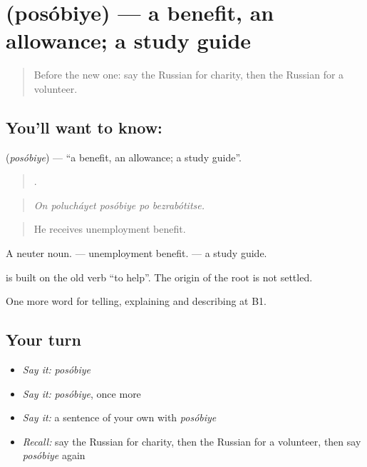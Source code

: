 \section[\texorpdfstring{\ru{пособие} (posóbiye)}{пособие (posóbiye)}]{ (posóbiye) — a benefit, an allowance; a study guide}

\label{lesson:RU-C368-posobie}



\begin{quote}
Before the new one: say the Russian for charity, then the Russian for a volunteer.
\end{quote}

\subsection*{You'll want to know: }
\textbf{} (\emph{posóbiye}) — \textquotedblleft{}a benefit, an allowance; a study guide\textquotedblright{}.

\begin{quote}
    .
\end{quote}

\begin{quote}
\emph{On polucháyet posóbiye po bezrabótitse.}
\end{quote}

\begin{quote}
He receives unemployment benefit.
\end{quote}

A neuter noun. \emph{  } — unemployment benefit. \emph{ } — a study guide.

\begin{cousinweb}
\textbf{} is built on the old verb \emph{} \textquotedblleft{}to help\textquotedblright{}. The origin of the root is not settled.
\end{cousinweb}

\begin{grammarlens}[title={What you've built}]
One more word for telling, explaining and describing at B1.
\end{grammarlens}

\subsection*{Your turn}
\begin{itemize}
\raggedright
  \item \emph{Say it:} \emph{posóbiye}
  \item \emph{Say it:} \emph{posóbiye}, once more
  \item \emph{Say it:} a sentence of your own with \emph{posóbiye}
  \item \emph{Recall:} say the Russian for charity, then the Russian for a volunteer, then say \emph{posóbiye} again
\end{itemize}

